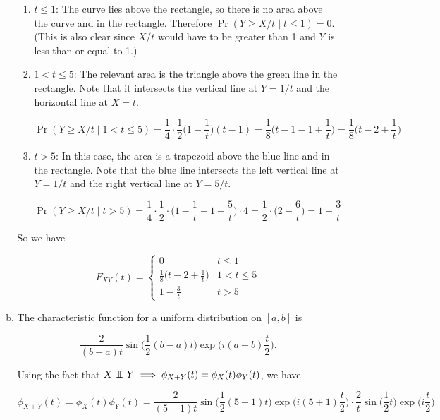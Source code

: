 \begin{enumerate}[(1)]
\begin{enumerate}[(a)]
\begin{enumerate}[(1)]

\item \(t \leq 1\): The curve lies above the rectangle, so there is no area above the curve and in the rectangle. Therefore \( \Pr(Y \geq X/t \mid t \leq 1) = 0\). (This is also clear since \(X/t\) would have to be greater than 1 and \(Y\) is less than or equal to 1.)

\item \(1 < t \leq 5\): The relevant area is the triangle above the green line in the rectangle. Note that it intersects the vertical line at \(Y = 1/t\) and the horizontal line at \(X = t\).

\[
\Pr(Y \geq X/t \mid 1 < t \leq 5) = \frac{1}{4} \cdot \frac{1}{2}\bigg(1 - \frac{1}{t} \bigg)(t - 1) = \frac{1}{8} \bigg(t - 1 - 1 + \frac{1}{t} \bigg) = \frac{1}{8} \bigg(t -2  + \frac{1}{t} \bigg) 
\]

\item \(t > 5\): In this case, the area is a trapezoid above the blue line and in the rectangle. Note that the blue line intersects the left vertical line at \(Y = 1/t\) and the right vertical line at \(Y = 5/t\).

\[
\Pr(Y \geq X/t \mid t > 5) = \frac{1}{4} \cdot  \frac{1}{2} \cdot \bigg(1 - \frac{1}{t} + 1 - \frac{5}{t} \bigg) \cdot 4 = \frac{1}{2} \cdot \bigg(2 - \frac{6}{t} \bigg)= 1 - \frac{3}{t}
\]


\end{enumerate}

So we have

\[
\boxed{
F_{XY}(t) = \begin{cases}
0 & t \leq 1 \\
\frac{1}{8} \bigg(t -2  + \frac{1}{t} \bigg) & 1 < t \leq 5 \\
1 - \frac{3}{t} & t > 5
\end{cases}
}
\]

\item The characteristic function for a uniform distribution on \([a, b]\) is 

\[
\frac{2}{(b-a)t} \sin \bigg( \frac{1}{2} (b-a)t \bigg) \exp \bigg(i(a+b) \frac{t}{2} \bigg).
\]

Using the fact that \(X \indep Y \implies \phi_{X + Y}(t) = \phi_X(t) \phi_Y(t)\), we have

\[
\phi_{X + Y}(t) = \phi_X(t) \phi_Y(t) = \frac{2}{(5-1)t} \sin \bigg( \frac{1}{2} (5-1)t \bigg) \exp \bigg(i(5+1) \frac{t}{2} \bigg)\cdot \frac{2}{t} \sin \bigg( \frac{1}{2} t \bigg) \exp \bigg(i \frac{t}{2} \bigg)
\]


\end{enumerate}
\end{enumerate}
